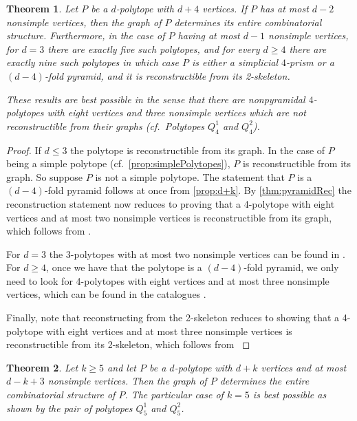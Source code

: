\documentclass[a4paper]{amsart}
\newtheorem{theorem}{Theorem}
\theoremstyle{definition}
\theoremstyle{remark}
\begin{document}
\begin{theorem}\label{thm:dPlus4VertRec} Let $P$ be a $d$-polytope with $d+4$ vertices. If  $P$ has at most $d-2$ nonsimple vertices, then the graph of $P$ determines its entire combinatorial structure. Furthermore, in the case of $P$ having at most $d-1$ nonsimple vertices, for $d=3$ there are exactly five such polytopes, and for every $d\ge4$ there are exactly nine such polytopes in which case $P$ is either a simplicial $4$-prism or a $(d-4)$-fold pyramid, and it is reconstructible from its 2-skeleton. 

These results are best possible in the sense that there are  nonpyramidal $4$-polytopes with eight vertices and three nonsimple vertices which are not reconstructible from their graphs  (cf.~Polytopes $Q^1_4$ and $Q^2_4$).
\end{theorem}
	
\begin{proof} If $d\le 3$ the polytope is reconstructible from its graph. In the case of $P$ being a simple polytope (cf.~\cref{prop:simplePolytopes}), $P$ is reconstructible from its graph.  So suppose $P$ is not  a simple polytope. The statement that $P$ is a $(d-4)$-fold pyramid follows at once from \cref{prop:d+k}.  By \cref{thm:pyramidRec} the reconstruction statement now reduces to proving that a 4-polytope with eight vertices and at most two nonsimple vertices is reconstructible from its graph, which follows from \cite[Thm.~4.6]{NevPinUgo17}. 

For $d=3$ the 3-polytopes with at most two nonsimple vertices can be found in \cite[Fig.~4]{BriDun73}. For $d\ge 4$, once we have that the polytope is a $(d-4)$-fold pyramid, we only need to look for 4-polytopes with eight vertices and at most three nonsimple vertices, which can be found in the catalogues \cite{FukMiyMor13a}.

Finally, note that reconstructing from the 2-skeleton reduces to showing that a 4-polytope with eight vertices and at most three nonsimple vertices is reconstructible from its 2-skeleton, which follows from \cite[Thm.~12.3.1]{Gru03}  
\end{proof}

	
\begin{theorem}\label{thm:d+kVert}
Let $k\ge 5$ and let $P$ be a $d$-polytope with $d+k$ vertices and  at most $d-k+3$ nonsimple vertices. Then the graph of $P$ determines the entire combinatorial structure of $P$. The particular case of $k=5$ is best possible as shown by the pair of polytopes $Q^1_5$  and $Q^2_5$.
\end{theorem}
	
\end{document}
